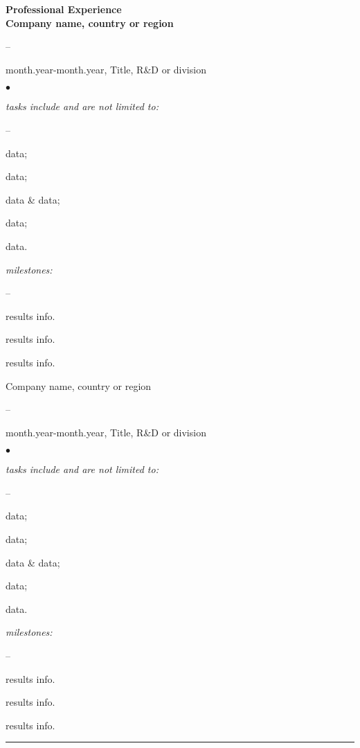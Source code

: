 \documentclass[oneside,final,10pt]{extreport}
\newenvironment{compactlist}{
	\begin{list}{{$\bullet$}}{
		\setlength\leftmargin{0.4cm}
		\setlength\partopsep{0pt}
		\setlength\parskip{0pt}
		\setlength\parsep{0pt}
		\setlength\topsep{0pt}
		\setlength\itemsep{0pt}
	}
}{
	\end{list}
}
\newenvironment{innerlist}{
	\begin{list}{--}{
		\setlength\leftmargin{0.8cm}
		\setlength\partopsep{0pt}
		\setlength\parskip{0pt}
		\setlength\parsep{0pt}
		\setlength\topsep{0pt}
		\setlength\itemsep{0pt}
	}
}{
	\end{list}
}
\begin{document}
\bfseries
Professional Experience \\
\mdseries
Company name, country or region
\mdseries
	\begin{innerlist}
		\bfseries
		\item month.year-month.year, Title, R\&D or division
		\mdseries
			\begin{compactlist}
				\item \textsl{tasks include and are not limited to:}
					\begin{innerlist}
						\item data;
						\item data;
						\item data \& data;
						\item data;
						\item data. 
					\end{innerlist}
				\item \textsl{milestones:}
					\begin{innerlist}
						\item results info.
						\item results info.
						\item results info.\\[1pt]
					\end{innerlist}
			\end{compactlist}
	\end{innerlist}

Company name, country or region
\mdseries
	\begin{innerlist}
		\bfseries
		\item month.year-month.year, Title, R\&D or division
		\mdseries
			\begin{compactlist}
				\item \textsl{tasks include and are not limited to:}
					\begin{innerlist}
						\item data;
						\item data;
						\item data \& data;
						\item data;
						\item data.
					\end{innerlist}
				\item \textsl{milestones:}
					\begin{innerlist}
						\item results info.
						\item results info.
						\item results info.\\[1pt]
					\end{innerlist}
			\end{compactlist}
	\end{innerlist}
\rule{\textwidth}{0.4pt}
\end{document}
